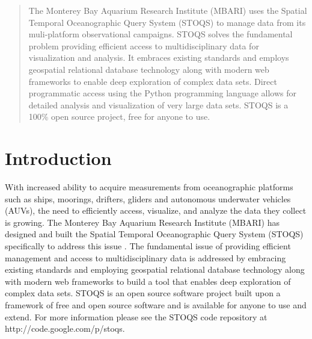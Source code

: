\documentclass[conference]{IEEEtran}
\begin{document}
\begin{abstract}

The Monterey Bay Aquarium Research Institute (MBARI) uses the Spatial Temporal Oceanographic Query System (STOQS) to manage data from its muli-platform observational campaigns. STOQS solves the fundamental problem providing efficient access to multidisciplinary data for visualization and analysis. It embraces existing standards and employs geospatial relational database technology along with modern web frameworks to enable deep exploration of complex data sets. Direct programmatic access using the Python programming language allows for detailed analysis and visualization of very large data sets. STOQS is a 100\% open source project, free for anyone to use.

\end{abstract}





%
\IEEEpeerreviewmaketitle


\section{Introduction}

With increased ability to acquire measurements from oceanographic platforms such as ships, moorings, drifters, gliders and autonomous underwater vehicles (AUVs), the need to efficiently access, visualize, and analyze the data they collect is growing. The Monterey Bay Aquarium Research Institute (MBARI) has designed and built the Spatial Temporal Oceanographic Query System (STOQS) specifically to address this issue \cite{imdis2013}. The fundamental issue of providing efficient management and access to multidisciplinary data is addressed by embracing existing standards and employing geospatial relational database technology along with modern web frameworks to build a tool that enables deep exploration of complex data sets. STOQS is an open source software project built upon a framework of free and open source software and is available for anyone to use and extend. For more information please see the STOQS code repository at http://code.google.com/p/stoqs.
\end{document}
